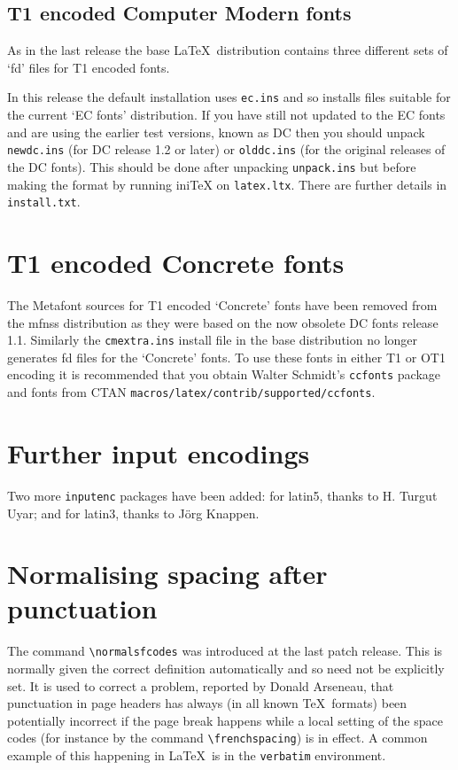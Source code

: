 \documentclass{ltnews}
\providecommand\pkg[1]{\texttt{#1}}
\providecommand\env[1]{\texttt{#1}}
\providecommand\file[1]{\texttt{#1}}
\begin{document}
\maketitle

\subsection{T1 encoded Computer Modern fonts}
As in the last release the base \LaTeX\ distribution contains
three different sets of `fd' files for T1 encoded fonts.

In this release the default installation uses \file{ec.ins}
and so installs files suitable for the current `EC fonts'
distribution. If you have still not updated to the EC fonts and
are using the earlier test versions, known as DC then you should
unpack \file{newdc.ins} (for DC release 1.2 or later) or
\file{olddc.ins} (for the original releases of the DC fonts).
This should be done after unpacking \file{unpack.ins} but
before making the format by running ini\TeX{} on \file{latex.ltx}.
There are further details in \file{install.txt}.


\section{T1 encoded Concrete fonts}
The Metafont sources for T1 encoded `Concrete' fonts have been
removed from the \textsf{mfnss} distribution as they were based
on the now obsolete DC fonts release 1.1. Similarly the
\file{cmextra.ins} install file in the \textsf{base} distribution no
longer generates fd files for the `Concrete' fonts.
To use these fonts in either T1 or OT1 encoding it is
recommended that you obtain Walter Schmidt's \pkg{ccfonts} package
and fonts from CTAN \file{macros/latex/contrib/supported/ccfonts}.


\section{Further input encodings}
Two more \pkg{inputenc} packages have been added: for latin5,
thanks to H. Turgut Uyar; and for latin3, thanks to J\"org Knappen.


\section{Normalising spacing after punctuation}
The command \verb|\normalsfcodes| was introduced at the last patch
release. This is normally given the correct definition automatically
and so need not be explicitly set. It is used to correct a problem,
reported by Donald Arseneau, that punctuation in page headers has
always (in all known \TeX\ formats) been potentially incorrect if the
page break happens while a local setting of the space codes (for
instance by the command \verb|\frenchspacing|) is in effect. A common
example of this happening in \LaTeX\ is in the \env{verbatim}
environment.
\end{document}

